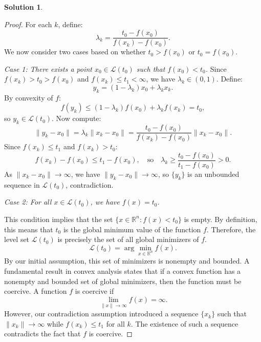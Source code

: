 \documentclass[12pt]{article}
\theoremstyle{definition}
\newtheorem*{solution}{\normalfont\textbf{Solution}}
\begin{document}
\begin{enumerate}[leftmargin=*]
\begin{solution}
\begin{proof}
                For each \( k \), define:
                \[
                \lambda_k = \frac{t_0 - f(x_0)}{f(x_k) - f(x_0)}.
                \]
                We now consider two cases based on whether \( t_0 > f(x_0) \) or \( t_0 = f(x_0) \).

                \textit{Case 1: There exists a point $ x_0 \in \mathcal{L}(t_0) $ such that $ f(x_0) < t_0 $.}    Since \( f(x_k) > t_0 > f(x_0) \) and \( f(x_k) \leq t_1 < \infty \), we have \( \lambda_k \in (0,1) \). Define:
                \[
                y_k = (1 - \lambda_k) x_0 + \lambda_k x_k.
                \]
                By convexity of \( f \):
                \[
                f(y_k) \leq (1 - \lambda_k) f(x_0) + \lambda_k f(x_k) = t_0,
                \]
                so \( y_k \in \mathcal{L}(t_0) \). Now compute:
                \[
                \|y_k - x_0\| = \lambda_k \|x_k - x_0\| = \frac{t_0 - f(x_0)}{f(x_k) - f(x_0)} \|x_k - x_0\|.
                \]
                Since \( f(x_k) \leq t_1 \) and \( f(x_k) > t_0 \):
                \[
                f(x_k) - f(x_0) \leq t_1 - f(x_0), \quad \text{so} \quad \lambda_k \geq \frac{t_0 - f(x_0)}{t_1 - f(x_0)} > 0.
                \]
                As \( \|x_k - x_0\| \to \infty \), we have \( \|y_k - x_0\| \to \infty \), so \( \{y_k\} \) is an unbounded sequence in \( \mathcal{L}(t_0) \), contradiction.

                \textit{Case 2: For all $ x \in \mathcal{L}(t_0) $, we have $ f(x) = t_0 $.}

                This condition implies that the set $ \{ x \in \mathbb{R}^n : f(x) < t_0 \} $ is empty.
                By definition, this means that $ t_0 $ is the global minimum value of the function $ f $.
                Therefore, the level set $ \mathcal{L}(t_0) $ is precisely the set of all global minimizers of $ f $.
                \[
                    \mathcal{L}(t_0) = \arg\min_{x \in \mathbb{R}^n} f(x).
                \]
                By our initial assumption, this set of minimizers is nonempty and bounded.
                A fundamental result in convex analysis states that if a convex function has a nonempty and bounded set of global minimizers, then the function must be coercive. A function $f$ is coercive if
                \[
                    \lim_{\|x\| \to \infty} f(x) = \infty.
                \]
                However, our contradiction assumption introduced a sequence $ \{x_k\} $ such that $ \|x_k\| \to \infty $ while $ f(x_k) \leq t_1 $ for all $ k $. The existence of such a sequence contradicts the fact that $ f $ is coercive.


\end{proof}
\end{solution}
\end{enumerate}
\end{document}
